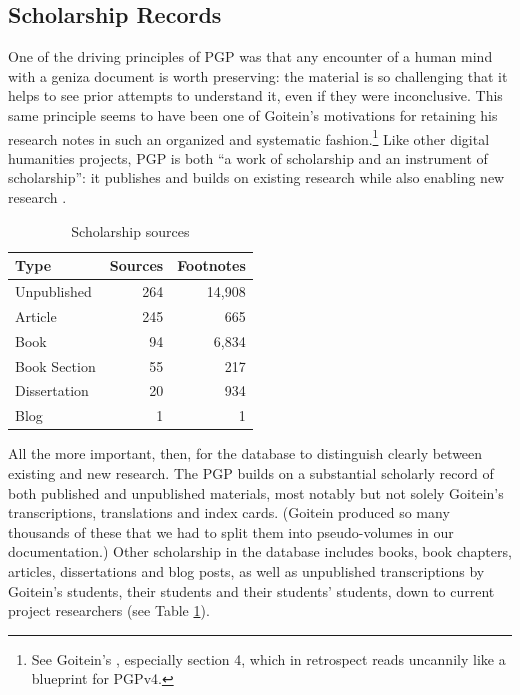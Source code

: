 \documentclass{article}
\begin{document}
\subsection{Scholarship Records}

One of the driving principles of PGP was that any encounter of a human mind with a geniza document is worth preserving: the material is so challenging that it helps to see prior attempts to understand it, even if they were inconclusive. This same principle seems to have been one of Goitein's motivations for retaining his research notes in such an organized and systematic fashion.\footnote{See Goitein's , especially section 4, which in retrospect reads uncannily like a blueprint for PGPv4.} Like other digital humanities projects, PGP is both “a work of scholarship and an instrument of scholarship”: it publishes and builds on existing research while also enabling new research \autocite[2]{kotin_world_2024}.

\begin{table}
\begin{center}
\caption{Scholarship sources}
\label{table:scholarship_sources}
\begin{tabular}{lrr}
\toprule
Type & Sources & Footnotes \\
\midrule
Unpublished & 264 & 14,908 \\
Article & 245 & 665 \\
Book & 94 & 6,834 \\
Book Section & 55 & 217 \\
Dissertation & 20 & 934  \\
Blog & 1 & 1 \\
\bottomrule
\end{tabular}   
\end{center}
\end{table}

All the more important, then, for the database to distinguish clearly between existing and new research. The PGP builds on a substantial scholarly record of both published and unpublished materials, most notably but not solely Goitein’s transcriptions, translations and index cards. (Goitein produced so many thousands of these that we had to split them into pseudo-volumes in our documentation.) Other scholarship in the database includes books, book chapters, articles, dissertations and blog posts, as well as unpublished transcriptions by Goitein’s students, their students and their students’ students, down to current project researchers (see Table \ref{table:scholarship_sources}). 
\end{document}
